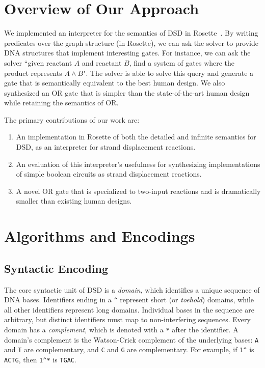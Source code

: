 \documentclass{article}
\begin{document}
\section{Overview of Our Approach}

We implemented an interpreter for the semantics of
DSD in Rosette~\cite{rosette}. By writing predicates
over the graph structure (in Rosette), we can ask
the solver to provide DNA structures that implement
interesting gates. For instance, we can ask the solver ``given
reactant $A$ and reactant $B$, find a system of gates where the
product represents $A \land B$". The solver is able to solve this
query and generate a gate that is semantically equivalent to
the best human design. We also synthesized an OR gate that
is simpler than the state-of-the-art human design while
retaining the semantics of OR.

The primary contributions of our work are:
\begin{enumerate}
\item
  An implementation in Rosette of both the detailed
  and infinite semantics for DSD, as an interpreter for
  strand displacement reactions.

\item
  An evaluation of this interpreter's usefulness for synthesizing
  implementations of simple boolean circuits as strand displacement
  reactions.

\item
  A novel OR gate that is specialized to two-input reactions and
  is dramatically smaller than existing human designs.
\end{enumerate}

\section{Algorithms and Encodings}

\subsection{Syntactic Encoding}

The core syntactic unit of DSD is a \emph{domain}, which identifies
a unique sequence of DNA bases.  Identifiers ending
in a \lstinline{^} represent short (or \emph{toehold}) domains,
while all other identifiers represent long domains.
Individual bases in the sequence are arbitrary, but distinct identifiers must
map to non-interfering sequences.
Every domain has a \emph{complement}, which is denoted
with a \lstinline{*} after the identifier. A domain's complement is
the Watson-Crick complement of the underlying bases: \lstinline{A} and \lstinline{T}
are complementary, and \lstinline{C} and \lstinline{G} are complementary.  
For example, if \lstinline{1^} is \lstinline{ACTG}, then \lstinline{1^*}
is \lstinline{TGAC}.
\end{document}
